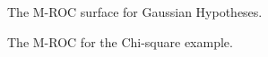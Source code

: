 \documentclass[12pt,journal,a4paper,twoside,onecolumn]{IEEEtran}
\begin{document}
\begin{spacing}{2}
\begin{figure}[!h]
           \begin{floatrow}
			 {\caption{The M-ROC surface for Gaussian Hypotheses.}
			\label{pic: LJS}
             }
			       {\caption{The M-ROC for the Chi-square example.}
              \label{pic: LJS for chisquare}
             }
           \end{floatrow}
\end{figure}



\end{spacing}
\end{document}
